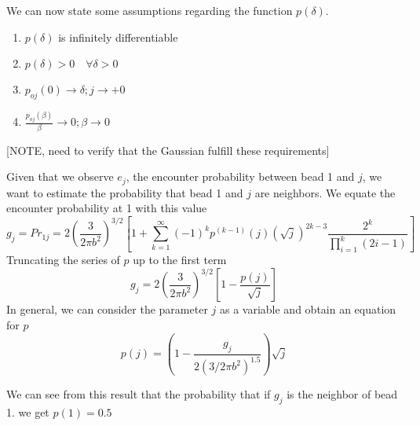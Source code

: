\documentclass[12pt]{article}
\begin{document}
We can now state some assumptions regarding the function $p(\delta)$.
\begin{enumerate}
	\item $p(\delta)$ is infinitely differentiable
	\item $p(\delta)>0 \quad  \forall \delta >0$
	\item $p_{oj}(0)\rightarrow \delta;  j\rightarrow +0$
	\item $\frac{p_{oj}(\beta)}{\beta}\rightarrow 0; \beta \rightarrow 0$
\end{enumerate}


[NOTE, need to verify that the Gaussian fulfill these requirements]

Given that we observe $e_j$, the encounter probability between bead 1 and $j$, we want to estimate the probability that bead 1 and $j$ are neighbors.
We equate the encounter probability at 1 with this value 
\begin{equation*}
g_j = Pr_{1j}=2\left(\frac{3}{2\pi b^2}\right)^{3/2}\left[ 1+\sum_{k=1}^\infty (-1)^k p^{(k-1)}(j)\left(\sqrt{j}\right)^{2k-3} \frac{2^k}{\prod_{i=1}^k (2i-1)}\right] 
\end{equation*}
Truncating the series of $p$ up to the first term 
\begin{equation*}
g_j = 2\left(\frac{3}{2\pi b^2}\right)^{3/2}\left[1 -\frac{p(j)}{\sqrt{j}}\right]
\end{equation*}
In general, we can consider the parameter $j$ as a variable and obtain an equation for $p$ 
\begin{equation*}
p(j)= \left(1-\frac{g_j}{2(3/2\pi b^2)^{1.5}}\right)\sqrt{j}
\end{equation*}

We can see from this result that the probability that if $g_j$ is the neighbor of bead 1. we get $p(1)=0.5$



\end{document}
